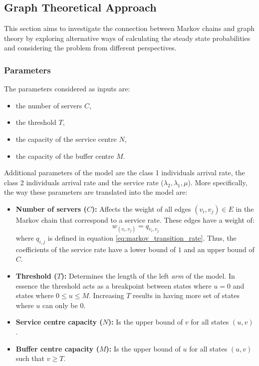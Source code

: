 \subsection{Graph Theoretical Approach}

This section aims to investigate the connection between Markov chains and graph 
theory by exploring alternative ways of calculating the steady state probabilities 
and considering the problem from different perspectives.

\subsubsection{Parameters}
The parameters considered as inputs are:
\begin{multicols}{2}
    \begin{itemize}
        \item the number of servers \(C\),
        \item the threshold \(T\), 
        \item the capacity of the service centre \(N\),
        \item the capacity of the buffer centre \(M\). 
    \end{itemize}
\end{multicols}

Additional parameters of the model are the class 1 individuals arrival rate, 
the class 2 individuals
arrival rate and the service rate (\(\lambda_2, \lambda_1, \mu\)). 
More specifically, the way these parameters are translated into the model are:

\begin{itemize}
    \item \textbf{Number of servers (\(C\)):} Affects the weight of all edges 
    \((v_i, v_j) \in E\) in the Markov chain that correspond to a service rate. 
    These edges have a weight of: 
    \begin{equation*}
        w_{(v_i, v_j)} = q_{v_i, v_j}
    \end{equation*}
    where \(q_{i,j}\) is defined in equation \ref{eq:markov_transition_rate}.
    Thus, the coefficients of the service rate have a lower bound of \(1\) and 
    an upper bound of \(C\).
    \item \textbf{Threshold (\(T\)):} Determines the length of the left 
    \textit{arm} of the model. 
    In essence the threshold acts as a breakpoint between states where \(u=0\) 
    and states where \(0 \leq u \leq M\). 
    Increasing \(T\) results in having more set of states where \(u\) can only 
    be \(0\).
    \item \textbf{Service centre capacity (\(N\)):} Is the upper bound of \(v\) for all 
    states \((u,v)\).
    \item \textbf{Buffer centre capacity (\(M\)):} Is the upper bound of \(u\) for all 
    states \((u,v)\) such that \(v \geq T\).
\end{itemize}


